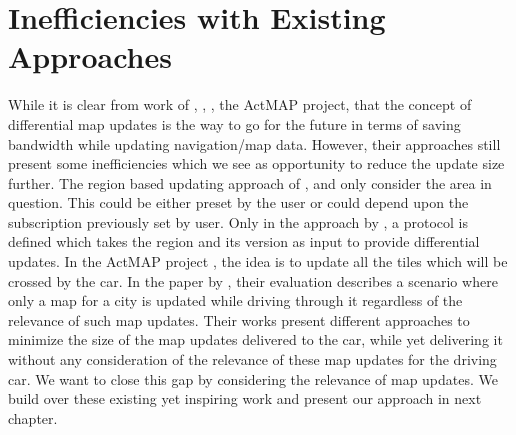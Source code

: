 


\section{Inefficiencies with Existing Approaches}
While it is clear from work of \citet{min2008mobile}, \citet{cooper2001incremental}, \citet{asahara2008locally}, the ActMAP project\cite{flament2003actmap}, \citet{fischer2012technique} that the concept of differential map updates is the way to go for the future in terms of saving bandwidth while updating navigation/map data. However, their approaches still present some inefficiencies which we see as opportunity to reduce the update size further. The region based updating approach of \citet{asahara2008locally}, \citet{min2008mobile} and \citet{fischer2012technique} only consider the area in question. This could be either preset by the user or could depend upon the subscription previously set by user. Only in the approach by \citet{min2011system}, a protocol is defined which takes the region and its version as input to provide differential updates. In the ActMAP project \cite{flament2003actmap}, the idea is to update all the tiles which will be crossed by the car. In the paper by \citet{bastiaensen2003actmap}, their evaluation describes a scenario where only a map for a city is updated while driving through it regardless of the relevance of such map updates. Their works present different approaches to minimize the size of the map updates delivered to the car, while yet delivering it without any consideration of the relevance of these map updates for the driving car. We want to close this gap by considering the relevance of map updates. We build over these existing yet inspiring work and present our approach in next chapter.     


